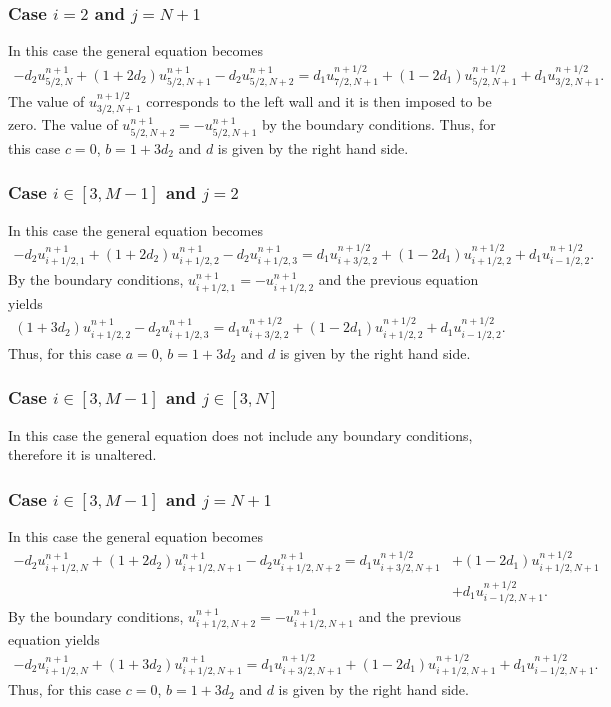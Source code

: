 \subsubsection*{Case $i=2$ and $j=N+1$}
In this case the general equation becomes
\begin{align*}
-d_2u_{5/2,N}^{n+1}+(1+2d_2)u_{5/2,N+1}^{n+1}-d_2u_{5/2,N+2}^{n+1}=d_1u_{7/2,N+1}^{n+1/2}+(1-2d_1)u_{5/2,N+1}^{n+1/2}+d_1u_{3/2,N+1}^{n+1/2}.
\end{align*}
The value of $u_{3/2,N+1}^{n+1/2}$ corresponds to the left wall and it is then imposed to be zero. The value of $u_{5/2,N+2}^{n+1}=-u_{5/2,N+1}^{n+1}$ by the boundary conditions. Thus, for this case $c=0$, $b=1+3d_2$ and $d$ is given by the right hand side. 

\subsubsection*{Case $i\in[3,M-1]$ and $j=2$}
In this case the general equation becomes
\begin{align*}
-d_2u_{i+1/2,1}^{n+1}+(1+2d_2)u_{i+1/2,2}^{n+1}-d_2u_{i+1/2,3}^{n+1}=d_1u_{i+3/2,2}^{n+1/2}+(1-2d_1)u_{i+1/2,2}^{n+1/2}+d_1u_{i-1/2,2}^{n+1/2}.
\end{align*}
By the boundary conditions, $u_{i+1/2,1}^{n+1}=-u_{i+1/2,2}^{n+1}$ and the previous equation yields
\begin{align*}
(1+3d_2)u_{i+1/2,2}^{n+1}-d_2u_{i+1/2,3}^{n+1}=d_1u_{i+3/2,2}^{n+1/2}+(1-2d_1)u_{i+1/2,2}^{n+1/2}+d_1u_{i-1/2,2}^{n+1/2}.
\end{align*}
Thus, for this case $a=0$, $b=1+3d_2$ and $d$ is given by the right hand side.
\subsubsection*{Case $i\in[3,M-1]$ and $j\in[3,N]$}
In this case the general equation does not include any boundary conditions, therefore it is unaltered.

\subsubsection*{Case $i\in[3,M-1]$ and $j=N+1$}
In this case the general equation becomes
\begin{align*}
-d_2u_{i+1/2,N}^{n+1}+(1+2d_2)u_{i+1/2,N+1}^{n+1}-d_2u_{i+1/2,N+2}^{n+1}=d_1u_{i+3/2,N+1}^{n+1/2}&+(1-2d_1)u_{i+1/2,N+1}^{n+1/2}\\&+d_1u_{i-1/2,N+1}^{n+1/2}.
\end{align*}
By the boundary conditions, $u_{i+1/2,N+2}^{n+1}=-u_{i+1/2,N+1}^{n+1}$ and the previous equation yields
\begin{align*}
-d_2u_{i+1/2,N}^{n+1}+(1+3d_2)u_{i+1/2,N+1}^{n+1}=d_1u_{i+3/2,N+1}^{n+1/2}+(1-2d_1)u_{i+1/2,N+1}^{n+1/2}+d_1u_{i-1/2,N+1}^{n+1/2}.
\end{align*}
Thus, for this case $c=0$, $b=1+3d_2$ and $d$ is given by the right hand side.



